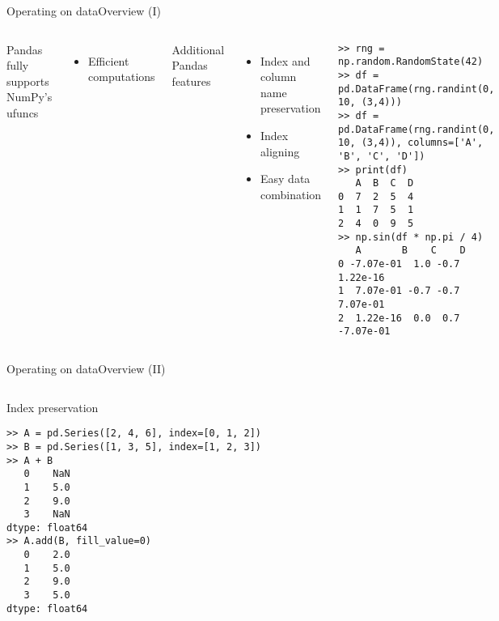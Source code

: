 \documentclass[10pt,compress]{beamer} %
\begin{document}
\begin{frame}[fragile]{Operating on data}{Overview (I)}
	\begin{columns}
		Pandas fully supports NumPy's ufuncs
		\begin{itemize}
			\item Efficient computations
		\end{itemize}
		Additional Pandas features
		\begin{itemize}
			\item Index and column name preservation
			\item Index aligning
			\item Easy data combination
		\end{itemize}

		\begin{exampleblock}{}
		\vspace{-0.2cm} 
			\begin{lstlisting}
>> rng = np.random.RandomState(42)
>> df = pd.DataFrame(rng.randint(0, 10, (3,4)))
>> df = pd.DataFrame(rng.randint(0, 10, (3,4)), columns=['A', 'B', 'C', 'D'])
>> print(df)
   A  B  C  D
0  7  2  5  4
1  1  7  5  1
2  4  0  9  5
>> np.sin(df * np.pi / 4)
   A       B    C    D
0 -7.07e-01  1.0 -0.7  1.22e-16
1  7.07e-01 -0.7 -0.7  7.07e-01
2  1.22e-16  0.0  0.7 -7.07e-01
\end{lstlisting}
			\vspace{-0.2cm} 
		\end{exampleblock}
	\end{columns}
\end{frame}

\begin{frame}[fragile]{Operating on data}{Overview (II)}
	\begin{columns}
 	   \column{0.8\textwidth}
		\begin{exampleblock}{Index preservation}
		\vspace{-0.2cm} 
			\begin{lstlisting}
>> A = pd.Series([2, 4, 6], index=[0, 1, 2])
>> B = pd.Series([1, 3, 5], index=[1, 2, 3])
>> A + B
   0    NaN
   1    5.0
   2    9.0
   3    NaN
dtype: float64
>> A.add(B, fill_value=0)
   0    2.0
   1    5.0
   2    9.0
   3    5.0
dtype: float64
\end{lstlisting}
			\vspace{-0.2cm} 
		\end{exampleblock}
	\end{columns}
\end{frame}
\end{document}
